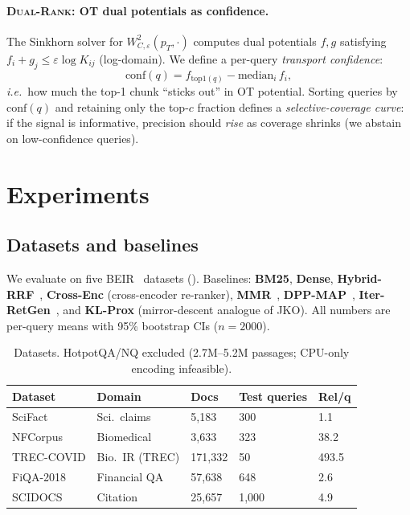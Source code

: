 \documentclass{article}
\theoremstyle{plain}
\newcommand{\Wdist}{W_{\!C,\varepsilon}}
\newcommand{\dualrank}{\textsc{Dual-Rank}}
\newcommand{\ie}{\textit{i.e.}}
\begin{document}
\paragraph{\dualrank: OT dual potentials as confidence.}
The Sinkhorn solver for $\Wdist^2(p_T, \cdot)$ computes dual potentials $f, g$ satisfying $f_i + g_j \leq \varepsilon\log K_{ij}$ (log-domain). We define a per-query \emph{transport confidence}:
\begin{equation}
  \mathrm{conf}(q) = f_{\mathrm{top1}(q)} - \mathrm{median}_i\, f_i,
\label{eq:conf}
\end{equation}
\ie\ how much the top-1 chunk ``sticks out'' in OT potential. Sorting queries by $\mathrm{conf}(q)$ and retaining only the top-$c$ fraction defines a \emph{selective-coverage curve}: if the signal is informative, precision should \emph{rise} as coverage shrinks (we abstain on low-confidence queries).


\section{Experiments}
\label{sec:experiments}

\subsection{Datasets and baselines}

We evaluate on five BEIR~\cite{thakur2021beir} datasets (). Baselines: \textbf{BM25}, \textbf{Dense}, \textbf{Hybrid-RRF}~\cite{rrf2009}, \textbf{Cross-Enc} (cross-encoder re-ranker), \textbf{MMR}~\cite{carbonell1998mmr}, \textbf{DPP-MAP}~\cite{chen2018dpp}, \textbf{Iter-RetGen}~\cite{shao2023iter}, and \textbf{KL-Prox} (mirror-descent analogue of JKO). All numbers are per-query means with 95\% bootstrap CIs ($n{=}2000$).

\begin{table}[h]
\centering\small
\caption{Datasets. HotpotQA/NQ excluded (2.7M--5.2M passages; CPU-only encoding infeasible).}
\label{tab:datasets}
\begin{tabular}{@{}lllll@{}}
\toprule
Dataset & Domain & Docs & Test queries & Rel/q \\
\midrule
SciFact~\cite{wadden2020scifact}  & Sci.\ claims & 5{,}183 & 300 & 1.1 \\
NFCorpus & Biomedical & 3{,}633 & 323 & 38.2 \\
TREC-COVID & Bio.\ IR (TREC) & 171{,}332 & 50 & 493.5 \\
FiQA-2018 & Financial QA & 57{,}638 & 648 & 2.6 \\
SCIDOCS & Citation & 25{,}657 & 1{,}000 & 4.9 \\
\bottomrule
\end{tabular}
\end{table}
\end{document}
